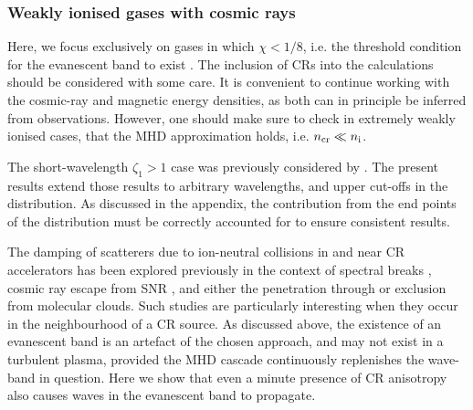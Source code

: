\documentclass[a4paper,fleqn,usenatbib]{mnras}
\begin{document}
\subsubsection*{Weakly ionised gases with cosmic rays}

Here, we focus exclusively on gases in which $\chi<1/8$, i.e. the threshold condition for the evanescent band to exist \citep{ZweibelShull}.
The inclusion of CRs into the calculations should be considered with some care. It is convenient to continue working with the cosmic-ray and magnetic energy densities, as both can in principle be inferred from observations. However, one should make sure to check in extremely weakly ionised cases, that the MHD approximation holds, i.e. $n_{\rm cr} \ll n_{\rm i}$. 

The short-wavelength $\zeta_1 > 1$ case was previously considered by \citet{Reville08}.  The present 
results extend those results to arbitrary wavelengths, and upper cut-offs in the distribution. As discussed in the appendix, the contribution from the end points of the distribution must be correctly accounted for to ensure consistent results. 

The damping of scatterers due to ion-neutral collisions in and near CR accelerators has been explored previously in the context of spectral breaks \citep{Malkovetal11}, cosmic ray escape from SNR \cite[e.g.][]{Xuetal16,Brahimi20}, and either the penetration through \citep{CesarskyVolk,Morlino,Inoue} or exclusion from \cite[e.g.][]{SkillingStrong} molecular clouds. Such studies are particularly interesting when they occur in the neighbourhood of a CR source. As discussed above, the existence of an evanescent band is an artefact of the chosen approach, and may not exist in a turbulent plasma, provided the MHD cascade continuously replenishes the wave-band in question. Here we show that even a minute presence of CR anisotropy also causes waves in the evanescent band to propagate.
\end{document}

